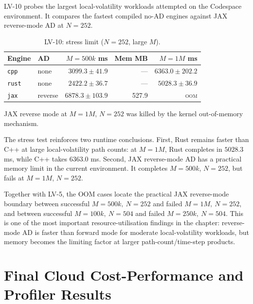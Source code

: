 LV-10 probes the largest local-volatility workloads attempted on the
Codespace environment.  It compares the fastest compiled no-AD engines
against JAX reverse-mode AD at \(N=252\).

\begin{table}[htbp]
\centering
\small
\begin{threeparttable}
\caption{LV-10: stress limit (\(N=252\), large \(M\)).}
\label{tab:lv10-stress-limit}
\begin{tabular}{llrrr}
\toprule
\textbf{Engine}
& \textbf{AD}
& \textbf{\(M=500k\) ms}
& \textbf{Mem MB}
& \textbf{\(M=1M\) ms} \\
\midrule
\texttt{cpp}  & none    & \(3099.3\pm 41.9\) & ---   & \(6363.0\pm202.2\) \\
\texttt{rust} & none    & \(2422.2\pm 36.7\) & ---   & \(5028.3\pm 36.9\) \\
\texttt{jax}  & reverse & \(6878.3\pm103.9\) & 527.9 & \textsc{oom} \\
\bottomrule
\end{tabular}
\begin{tablenotes}
\footnotesize
\item JAX reverse mode at \(M=1M\), \(N=252\) was killed by the kernel
out-of-memory mechanism.
\end{tablenotes}
\end{threeparttable}
\end{table}

The stress test reinforces two runtime conclusions.  First, Rust remains faster than
C++ at large local-volatility path counts: at \(M=1M\), Rust completes in
\(5028.3\) ms, while C++ takes \(6363.0\) ms.  Second, JAX reverse-mode AD
has a practical memory limit in the current environment.  It completes
\(M=500k\), \(N=252\), but fails at \(M=1M\), \(N=252\).

Together with LV-5, the OOM cases locate the practical JAX reverse-mode
boundary between successful \(M=500k,\ N=252\) and failed \(M=1M,\ N=252\),
and between successful \(M=100k,\ N=504\) and failed \(M=250k,\ N=504\).
This is one of the most important resource-utilisation findings in the
chapter: reverse-mode AD is faster than forward mode for moderate
local-volatility workloads, but memory becomes the limiting factor at larger
path-count/time-step products.

\section{Final Cloud Cost-Performance and Profiler Results}
\label{sec:results-cloud-profiler}

